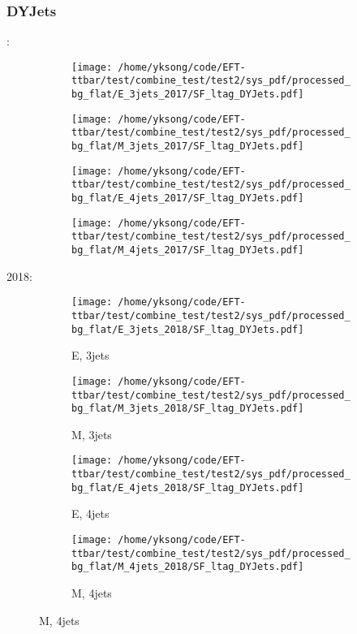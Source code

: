 \documentclass{beamer}
\begin{document}
\begin{frame}
\frametitle{DYJets}
\fontsize{5}{1}:
\begin{figure}
\centering
\begin{subfigure}[b]{0.24\textwidth}
\texttt{[image: /home/yksong/code/EFT-ttbar/test/combine\_test/test2/sys\_pdf/processed\_bg\_flat/E\_3jets\_2017/SF\_ltag\_DYJets.pdf]}
\end{subfigure}
\begin{subfigure}[b]{0.24\textwidth}
\texttt{[image: /home/yksong/code/EFT-ttbar/test/combine\_test/test2/sys\_pdf/processed\_bg\_flat/M\_3jets\_2017/SF\_ltag\_DYJets.pdf]}
\end{subfigure}
\begin{subfigure}[b]{0.24\textwidth}
\texttt{[image: /home/yksong/code/EFT-ttbar/test/combine\_test/test2/sys\_pdf/processed\_bg\_flat/E\_4jets\_2017/SF\_ltag\_DYJets.pdf]}
\end{subfigure}
\begin{subfigure}[b]{0.24\textwidth}
\texttt{[image: /home/yksong/code/EFT-ttbar/test/combine\_test/test2/sys\_pdf/processed\_bg\_flat/M\_4jets\_2017/SF\_ltag\_DYJets.pdf]}
\end{subfigure}
\end{figure}
2018:
\begin{figure}
\centering
\begin{subfigure}[b]{0.24\textwidth}
\texttt{[image: /home/yksong/code/EFT-ttbar/test/combine\_test/test2/sys\_pdf/processed\_bg\_flat/E\_3jets\_2018/SF\_ltag\_DYJets.pdf]}
\captionsetup{font=tiny}
\caption{E, 3jets}
\end{subfigure}
\begin{subfigure}[b]{0.24\textwidth}
\texttt{[image: /home/yksong/code/EFT-ttbar/test/combine\_test/test2/sys\_pdf/processed\_bg\_flat/M\_3jets\_2018/SF\_ltag\_DYJets.pdf]}
\captionsetup{font=tiny}
\caption{M, 3jets}
\end{subfigure}
\begin{subfigure}[b]{0.24\textwidth}
\texttt{[image: /home/yksong/code/EFT-ttbar/test/combine\_test/test2/sys\_pdf/processed\_bg\_flat/E\_4jets\_2018/SF\_ltag\_DYJets.pdf]}
\captionsetup{font=tiny}
\caption{E, 4jets}
\end{subfigure}
\begin{subfigure}[b]{0.24\textwidth}
\texttt{[image: /home/yksong/code/EFT-ttbar/test/combine\_test/test2/sys\_pdf/processed\_bg\_flat/M\_4jets\_2018/SF\_ltag\_DYJets.pdf]}
\captionsetup{font=tiny}
\caption{M, 4jets}
\end{subfigure}
\end{figure}
\end{frame}
\end{document}
